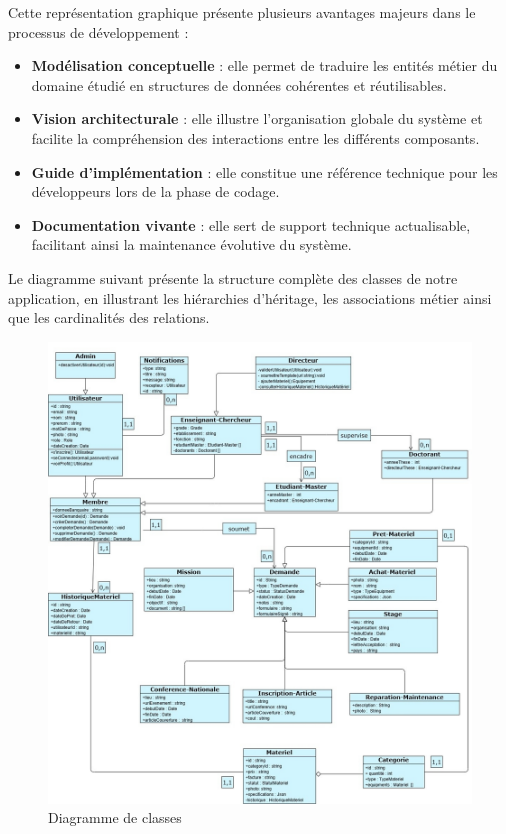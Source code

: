 Cette représentation graphique présente plusieurs avantages majeurs dans le processus de développement :
\begin{itemize}
    \item \textbf{Modélisation conceptuelle} : elle permet de traduire les entités métier du domaine étudié en structures de données cohérentes et réutilisables.
    \item \textbf{Vision architecturale} : elle illustre l’organisation globale du système et facilite la compréhension des interactions entre les différents composants.
    \item \textbf{Guide d’implémentation} : elle constitue une référence technique pour les développeurs lors de la phase de codage.
    \item \textbf{Documentation vivante} : elle sert de support technique actualisable, facilitant ainsi la maintenance évolutive du système.
\end{itemize}

Le diagramme suivant présente la structure complète des classes de notre application, en illustrant les hiérarchies d’héritage, les associations métier ainsi que les cardinalités des relations.

\begin{figure}[H]
    \centering
    \includegraphics[width=\textwidth]{images/diagramme_de_classe/class.jpg}
    \caption{Diagramme de classes}
    \label{fig:class_diagram}
\end{figure}

